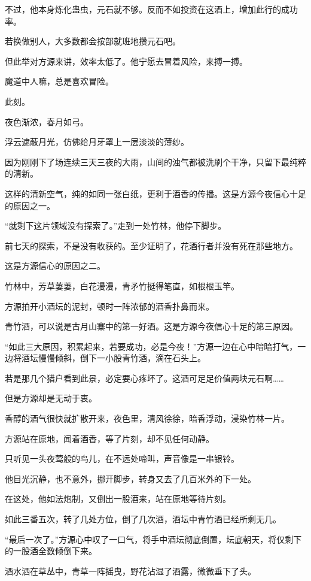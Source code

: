 \begin{this_body}
不过，他本身炼化蛊虫，元石就不够。反而不如投资在这酒上，增加此行的成功率。

若换做别人，大多数都会按部就班地攒元石吧。

但此举对方源来讲，效率太低了。他宁愿去冒着风险，来搏一搏。

魔道中人嘛，总是喜欢冒险。

此刻。

夜色渐浓，春月如弓。

浮云遮蔽月光，仿佛给月牙罩上一层淡淡的薄纱。

因为刚刚下了场连续三天三夜的大雨，山间的浊气都被洗刷个干净，只留下最纯粹的清新。

这样的清新空气，纯的如同一张白纸，更利于酒香的传播。这是方源今夜信心十足的原因之一。

“就剩下这片领域没有探索了。”走到一处竹林，他停下脚步。

前七天的探索，不是没有收获的。至少证明了，花酒行者并没有死在那些地方。

这是方源信心的原因之二。

竹林中，芳草萋萋，白花漫漫，青矛竹挺得笔直，如根根玉竿。

方源拍开小酒坛的泥封，顿时一阵浓郁的酒香扑鼻而来。

青竹酒，可以说是古月山寨中的第一好酒。这是方源今夜信心十足的第三原因。

“如此三大原因，积累起来，若要成功，必是今夜！”方源一边在心中暗暗打气，一边将酒坛慢慢倾斜，倒下一小股青竹酒，滴在石头上。

若是那几个猎户看到此景，必定要心疼坏了。这酒可足足价值两块元石啊……

但是方源却是无动于衷。

香醇的酒气很快就扩散开来，夜色里，清风徐徐，暗香浮动，浸染竹林一片。

方源站在原地，闻着酒香，等了片刻，却不见任何动静。

只听见一头夜莺般的鸟儿，在不远处啼叫，声音像是一串银铃。

他目光沉静，也不意外，挪开脚步，转身又去了几百米外的下一处。

在这处，他如法炮制，又倒出一股酒来，站在原地等待片刻。

如此三番五次，转了几处方位，倒了几次酒，酒坛中青竹酒已经所剩无几。

“最后一次了。”方源心中叹了一口气，将手中酒坛彻底倒置，坛底朝天，将仅剩下的一股酒全数倾倒下来。

酒水洒在草丛中，青草一阵摇曳，野花沾湿了酒露，微微垂下了头。


\end{this_body}
